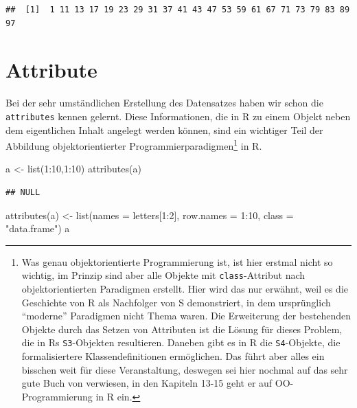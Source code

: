 \documentclass[
]{book}
\newenvironment{Shaded}{\begin{snugshade}}{\end{snugshade}}
\newcommand{\AttributeTok}[1]{\textcolor[rgb]{0.77,0.63,0.00}{#1}}
\newcommand{\DecValTok}[1]{\textcolor[rgb]{0.00,0.00,0.81}{#1}}
\newcommand{\FunctionTok}[1]{\textcolor[rgb]{0.00,0.00,0.00}{#1}}
\newcommand{\NormalTok}[1]{#1}
\newcommand{\OtherTok}[1]{\textcolor[rgb]{0.56,0.35,0.01}{#1}}
\newcommand{\SpecialCharTok}[1]{\textcolor[rgb]{0.00,0.00,0.00}{#1}}
\newcommand{\StringTok}[1]{\textcolor[rgb]{0.31,0.60,0.02}{#1}}
\begin{document}
\begin{verbatim}
##  [1]  1 11 13 17 19 23 29 31 37 41 43 47 53 59 61 67 71 73 79 83 89 97
\end{verbatim}

\hypertarget{attribute}{%
\chapter{Attribute}\label{attribute}}

Bei der sehr umständlichen Erstellung des Datensatzes haben wir schon die \texttt{attributes} kennen gelernt. Diese Informationen, die in R zu einem Objekt neben dem eigentlichen Inhalt angelegt werden können, sind ein wichtiger Teil der Abbildung objektorientierter Programmierparadigmen\footnote{Was genau objektorientierte Programmierung ist, ist hier erstmal nicht so wichtig, im Prinzip sind aber alle Objekte mit \texttt{class}-Attribut nach objektorientierten Paradigmen erstellt. Hier wird das nur erwähnt, weil es die Geschichte von R als Nachfolger von S demonstriert, in dem ursprünglich ``moderne'' Paradigmen nicht Thema waren. Die Erweiterung der bestehenden Objekte durch das Setzen von Attributen ist die Lösung für dieses Problem, die in Rs \texttt{S3}-Objekten resultieren. Daneben gibt es in R die \texttt{S4}-Objekte, die formalisiertere Klassendefinitionen ermöglichen. Das führt aber alles ein bisschen weit für diese Veranstaltung, deswegen sei hier nochmal auf das sehr gute Buch von \citet{wickhamAdvanced2019} verwiesen, in den Kapiteln 13-15 geht er auf OO-Programmierung in R ein.} in R.

\begin{Shaded}
\begin{Highlighting}[]
\NormalTok{a }\OtherTok{\textless{}{-}} \FunctionTok{list}\NormalTok{(}\DecValTok{1}\SpecialCharTok{:}\DecValTok{10}\NormalTok{,}\DecValTok{1}\SpecialCharTok{:}\DecValTok{10}\NormalTok{)}
\FunctionTok{attributes}\NormalTok{(a)}
\end{Highlighting}
\end{Shaded}

\begin{verbatim}
## NULL
\end{verbatim}

\begin{Shaded}
\begin{Highlighting}[]
\FunctionTok{attributes}\NormalTok{(a) }\OtherTok{\textless{}{-}} \FunctionTok{list}\NormalTok{(}\AttributeTok{names =}\NormalTok{ letters[}\DecValTok{1}\SpecialCharTok{:}\DecValTok{2}\NormalTok{],}
                      \AttributeTok{row.names =} \DecValTok{1}\SpecialCharTok{:}\DecValTok{10}\NormalTok{,}
                      \AttributeTok{class =} \StringTok{"data.frame"}\NormalTok{)}
\NormalTok{a}
\end{Highlighting}
\end{Shaded}
\end{document}
